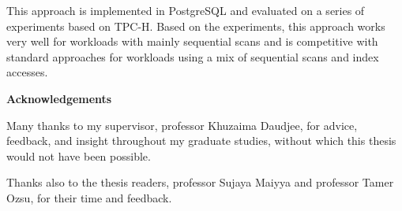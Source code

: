 This approach is implemented in PostgreSQL and evaluated on a series of experiments based on TPC-H. Based on the experiments, this approach works very well for workloads with mainly sequential scans and is competitive with standard approaches for workloads using a mix of sequential scans and index accesses.


\cleardoublepage
{}    %

\begin{center}\textbf{Acknowledgements}\end{center}

Many thanks to my supervisor, professor Khuzaima Daudjee, for advice, feedback, and insight throughout my graduate studies, without which this thesis would not have been possible.

Thanks also to the thesis readers, professor Sujaya Maiyya and professor Tamer Ozsu, for their time and feedback.



\cleardoublepage
{}    %




\renewcommand\contentsname{Table of Contents}
\tableofcontents
\cleardoublepage
{}    %

\listoffigures
\cleardoublepage
{}		%


\renewcommand*{\abbreviationsname}{List of Abbreviations}
\printglossary[type=abbreviations]
\cleardoublepage
{}		%




